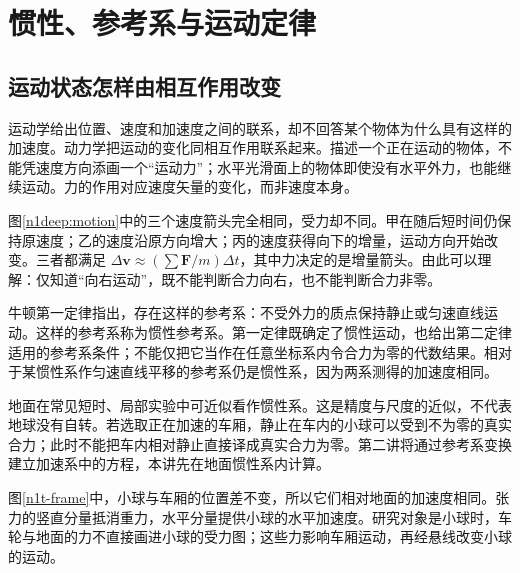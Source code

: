 \section{惯性、参考系与运动定律}
\subsection{运动状态怎样由相互作用改变}
运动学给出位置、速度和加速度之间的联系，却不回答某个物体为什么具有这样的加速度。动力学把运动的变化同相互作用联系起来。描述一个正在运动的物体，不能凭速度方向添画一个“运动力”；水平光滑面上的物体即使没有水平外力，也能继续运动。力的作用对应速度矢量的变化，而非速度本身。

图\ref{n1deep:motion}中的三个速度箭头完全相同，受力却不同。甲在随后短时间仍保持原速度；乙的速度沿原方向增大；丙的速度获得向下的增量，运动方向开始改变。三者都满足 $\Delta\bm v\approx(\sum\bm F/m)\Delta t$，其中力决定的是增量箭头。由此可以理解：仅知道“向右运动”，既不能判断合力向右，也不能判断合力非零。

牛顿第一定律指出，存在这样的参考系：不受外力的质点保持静止或匀速直线运动。这样的参考系称为惯性参考系。第一定律既确定了惯性运动，也给出第二定律适用的参考系条件；不能仅把它当作在任意坐标系内令合力为零的代数结果。相对于某惯性系作匀速直线平移的参考系仍是惯性系，因为两系测得的加速度相同。

地面在常见短时、局部实验中可近似看作惯性系。这是精度与尺度的近似，不代表地球没有自转。若选取正在加速的车厢，静止在车内的小球可以受到不为零的真实合力；此时不能把车内相对静止直接译成真实合力为零。第二讲将通过参考系变换建立加速系中的方程，本讲先在地面惯性系内计算。

图\ref{n1t-frame}中，小球与车厢的位置差不变，所以它们相对地面的加速度相同。张力的竖直分量抵消重力，水平分量提供小球的水平加速度。研究对象是小球时，车轮与地面的力不直接画进小球的受力图；这些力影响车厢运动，再经悬线改变小球的运动。

